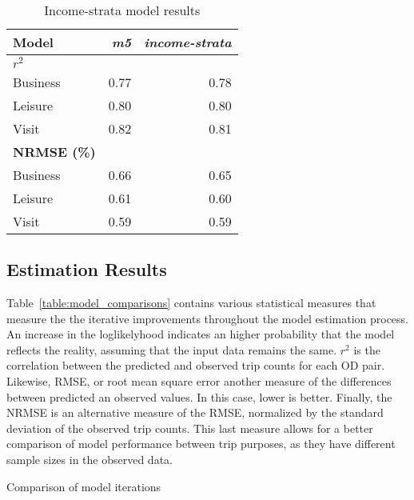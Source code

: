 \begin{table}[H]
\centering
\caption{Income-strata model results}
\label{table:income-strata-results}
\begin{tabular}{lrr}
\toprule
\textbf{Model} & \textit{\textbf{m5}} & \textit{\textbf{income-strata}} \\
\midrule
\boldmath{}\textbf{$r^2$}\unboldmath{} &       &   \\
Business & 0.77 & 0.78 \\
Leisure & 0.80 & 0.80\\
Visit  &  0.82 & 0.81\\
\midrule
\textbf{NRMSE (\%)} & & \\
Business  & 0.66 & 0.65 \\
Leisure & 0.61 & 0.60 \\
Visit &  0.59 & 0.59\\
\bottomrule
\end{tabular}%
\end{table}

\subsection{Estimation Results}
Table~\ref{table:model_comparisons} contains various statistical measures that measure the the iterative improvements throughout the model estimation process. An increase in the loglikelyhood indicates an higher probability that the model reflects the reality, assuming that the input data remains the same. $r^2$ is the correlation between the predicted and observed trip counts for each OD pair. Likewise, RMSE, or root mean square error another measure of the differences between predicted an observed values. In this case, lower is better. Finally, the NRMSE is an alternative measure of the RMSE, normalized by the standard deviation of the observed trip counts. This last measure allows for a better comparison of model performance between trip purposes, as they have different sample sizes in the observed data. 

\begin{table}[H]
\centering
\caption{Comparison of model iterations}
\label{table:model_comparisons}


\end{table}


